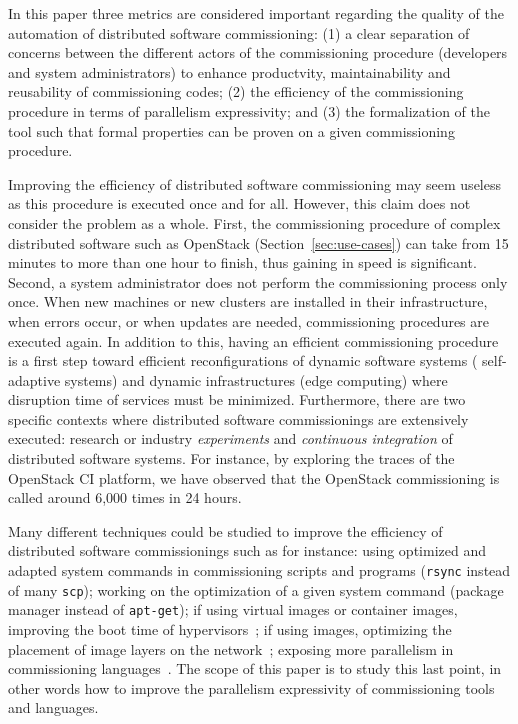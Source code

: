 In this paper three metrics are considered important regarding the
quality of the automation of distributed software commissioning: (1) a
clear separation of concerns between the different actors of the
commissioning procedure (\ie developers and system administrators) to
enhance productvity, maintainability and reusability of commissioning
codes; (2) the efficiency of the commissioning procedure in terms of
parallelism expressivity; and (3) the formalization of the tool such
that formal properties can be proven on a given commissioning
procedure.

Improving the efficiency of distributed software commissioning may
seem useless as this procedure is executed once and for all. However,
this claim does not consider the problem as a whole.
%
First, the commissioning procedure of complex distributed software
such as OpenStack (Section~\ref{sec:use-cases}) can take from 15
minutes to more than one hour to finish, thus gaining in speed is
significant. Second, a system administrator does not perform the
commissioning process only once. When new machines or new clusters are
installed in their infrastructure, when errors occur, or when updates
are needed, commissioning procedures are executed again. In addition
to this, having an efficient commissioning procedure is a first step
toward efficient reconfigurations of dynamic software systems (\eg
self-adaptive systems) and dynamic infrastructures (\eg edge
computing) where disruption time of services must be minimized.
Furthermore, there are two specific contexts where distributed
software commissionings are extensively executed: research or industry
\emph{experiments} and \emph{continuous integration} of distributed
software systems. For instance, by exploring the traces of the
OpenStack CI platform, we have observed that the OpenStack
commissioning is called around 6,000 times in 24 hours.

Many different techniques could be studied to improve the efficiency
of distributed software commissionings such as for instance: using
optimized and adapted system commands in commissioning scripts and
programs (\eg \texttt{rsync} instead of many \texttt{scp}); working on
the optimization of a given system command (\eg \nix package manager
instead of \texttt{apt-get}); if using virtual images or container
images, improving the boot time of
hypervisors~\cite{nguyen:hal-02172288}; if using \docker images,
optimizing the placement of image layers on the
network~\cite{darrous:hal-01745405}; exposing more parallelism in
commissioning languages~\cite{dicosmo:hal-01233489}. The scope of this
paper is to study this last point, in other words how to improve the
parallelism expressivity of commissioning tools and languages.

